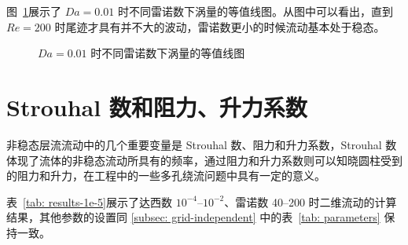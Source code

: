图~\ref{fig: vorticity-contour-1e-2}展示了 $Da=0.01$ 时不同雷诺数下涡量的等值线图。从图中可以看出，直到 $Re=200$ 时尾迹才具有并不大的波动，雷诺数更小的时候流动基本处于稳态。

\begin{figure}
	\centering
	\begin{minipage}{\textwidth}
		\centering
	\end{minipage}
	\centering
	\begin{minipage}{\textwidth}
		\centering
	\end{minipage}
	\caption{$Da=0.01$ 时不同雷诺数下涡量的等值线图}
	\label{fig: vorticity-contour-1e-2}
\end{figure}

\section{Strouhal 数和阻力、升力系数}\label{sec: stcdcl}

非稳态层流流动中的几个重要变量是 Strouhal 数、阻力和升力系数，Strouhal 数体现了流体的非稳态流动所具有的频率，通过阻力和升力系数则可以知晓圆柱受到的阻力和升力，在工程中的一些多孔绕流问题中具有一定的意义。

表~\ref{tab: results-1e-5}展示了达西数 $10^{-4}$--$10^{-2}$、雷诺数 40--200 时二维流动的计算结果，其他参数的设置同 \ref{subsec: grid-independent} 中的表~\ref{tab: parameters} 保持一致。

